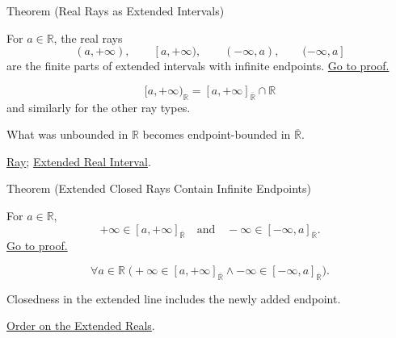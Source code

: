 \begin{theorembox}{Theorem (Real Rays as Extended Intervals)}
\begin{theorem}
\label{thm:real-rays-as-extended-intervals}
For $a\in\mathbb{R}$, the real rays
\[
(a,+\infty),\qquad [a,+\infty),\qquad
(-\infty,a),\qquad (-\infty,a]
\]
are the finite parts of extended intervals with infinite endpoints.
\hyperref[prf:real-rays-as-extended-intervals]{Go to proof.}
\end{theorem}
\end{theorembox}
\begin{remark*}
\[
[a,+\infty)_{\mathbb{R}}
= [a,+\infty]_{\overline{\mathbb{R}}}\cap\mathbb{R}
\]
and similarly for the other ray types.
\end{remark*}
\begin{remark*}[Interpretation]
What was unbounded in $\mathbb{R}$ becomes endpoint-bounded in
$\overline{\mathbb{R}}$.
\end{remark*}
\begin{dependencies}
\hyperref[def:ray]{Ray};
\hyperref[def:extended-real-interval]{Extended Real Interval}.
\end{dependencies}

\begin{theorembox}{Theorem (Extended Closed Rays Contain Infinite Endpoints)}
\begin{theorem}
\label{thm:extended-closed-rays-contain-infinite-endpoints}
For $a\in\mathbb{R}$,
\[
+\infty\in [a,+\infty]_{\overline{\mathbb{R}}}
\quad\text{and}\quad
-\infty\in [-\infty,a]_{\overline{\mathbb{R}}}.
\]
\hyperref[prf:extended-closed-rays-contain-infinite-endpoints]{Go to proof.}
\end{theorem}
\end{theorembox}
\begin{remark*}
\[
\forall a\in\mathbb{R}\;
\bigl(+\infty\in [a,+\infty]_{\overline{\mathbb{R}}}
\land -\infty\in [-\infty,a]_{\overline{\mathbb{R}}}\bigr).
\]
\end{remark*}
\begin{remark*}[Interpretation]
Closedness in the extended line includes the newly added endpoint.
\end{remark*}
\begin{dependencies}
\hyperref[def:extended-real-order]{Order on the Extended Reals}.
\end{dependencies}

